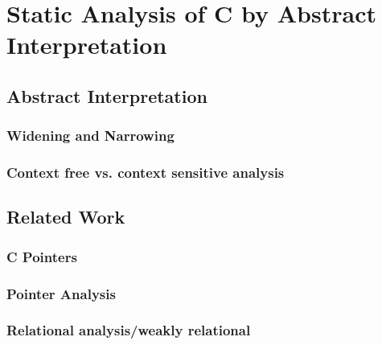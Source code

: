\chapter{Static Analysis of C by Abstract Interpretation}

\section{Abstract Interpretation}

\subsection{Widening and Narrowing}

\subsection{Context free vs. context sensitive analysis}

\section{Related Work}

\subsection{C Pointers}

\subsection{Pointer Analysis}

\subsection{Relational analysis/weakly relational}


